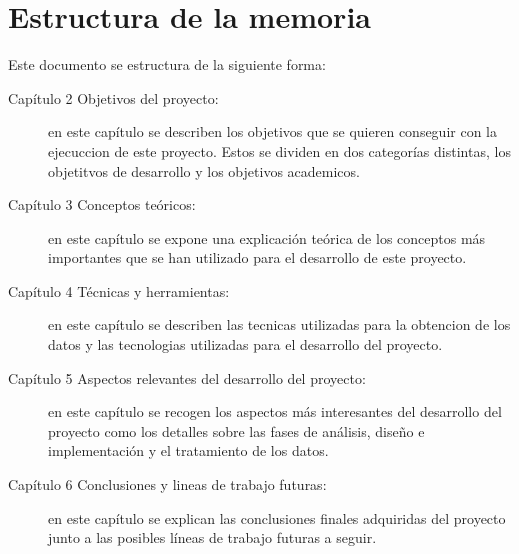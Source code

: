 \section{Estructura de la memoria}

Este documento se estructura de la siguiente forma:
\begin{description}

\item[Capítulo 2 Objetivos del proyecto:] en este capítulo se describen los objetivos que se quieren conseguir con la ejecuccion de este proyecto. Estos se dividen en dos categorías distintas,
los objetitvos de desarrollo y los objetivos academicos.


\item[Capítulo 3 Conceptos teóricos:] en este capítulo se expone una explicación teórica de los conceptos más importantes que se han utilizado para el desarrollo de este proyecto.

\item[Capítulo 4 Técnicas y herramientas:] en este capítulo se describen las tecnicas utilizadas para la obtencion de los datos y las tecnologias utilizadas para el desarrollo del proyecto.


\item[Capítulo 5 Aspectos relevantes del desarrollo del proyecto:] en este capítulo se recogen los aspectos más interesantes del desarrollo del proyecto como los detalles sobre las fases de análisis, diseño e implementación y el tratamiento de los datos.


\item[Capítulo 6 Conclusiones y lineas de trabajo futuras:] en este capítulo se explican las conclusiones finales adquiridas del proyecto junto a las posibles líneas de trabajo futuras a seguir.


\end{description}




